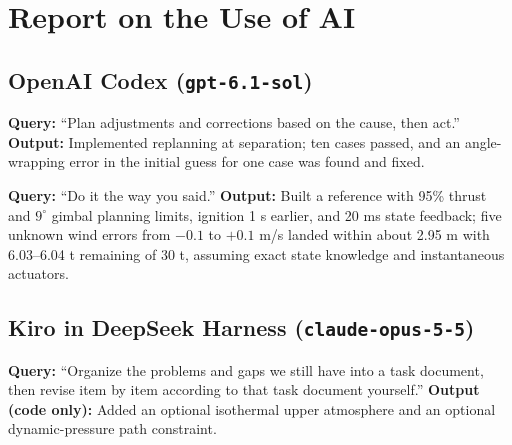 \section*{Report on the Use of AI}

\subsection*{OpenAI Codex (\texttt{gpt-6.1-sol})}
\begingroup\small
\noindent\textbf{Query:} ``Plan adjustments and corrections based on the cause, then act.'' \textbf{Output:} Implemented replanning at separation; ten cases passed, and an angle-wrapping error in the initial guess for one case was found and fixed.\par\smallskip
\noindent\textbf{Query:} ``Do it the way you said.'' \textbf{Output:} Built a reference with 95\% thrust and $9^\circ$ gimbal planning limits, ignition 1 s earlier, and 20 ms state feedback; five unknown wind errors from $-0.1$ to $+0.1$ m/s landed within about 2.95 m with 6.03--6.04 t remaining of 30 t, assuming exact state knowledge and instantaneous actuators.\par
\endgroup

\subsection*{Kiro in DeepSeek Harness (\texttt{claude-opus-5-5})}
\begingroup\small
\noindent\textbf{Query:} ``Organize the problems and gaps we still have into a task document, then revise item by item according to that task document yourself.'' \textbf{Output (code only):} Added an optional isothermal upper atmosphere and an optional dynamic-pressure path constraint.\par
\endgroup
